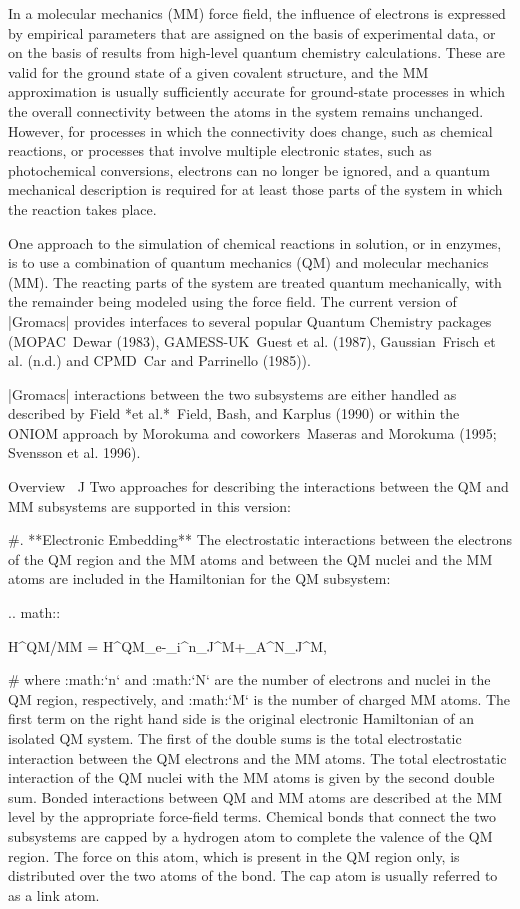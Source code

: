 In a molecular mechanics (MM) force field, the influence of electrons is
expressed by empirical parameters that are assigned on the basis of
experimental data, or on the basis of results from high-level quantum
chemistry calculations. These are valid for the ground state of a given
covalent structure, and the MM approximation is usually sufficiently
accurate for ground-state processes in which the overall connectivity
between the atoms in the system remains unchanged. However, for
processes in which the connectivity does change, such as chemical
reactions, or processes that involve multiple electronic states, such as
photochemical conversions, electrons can no longer be ignored, and a
quantum mechanical description is required for at least those parts of
the system in which the reaction takes place.

One approach to the simulation of chemical reactions in solution, or in
enzymes, is to use a combination of quantum mechanics (QM) and molecular
mechanics (MM). The reacting parts of the system are treated quantum
mechanically, with the remainder being modeled using the force field.
The current version of |Gromacs| provides interfaces to several popular
Quantum Chemistry packages (MOPAC Dewar (1983), GAMESS-UK Guest et al.
(1987), Gaussian Frisch et al. (n.d.) and CPMD Car and Parrinello
(1985)).

|Gromacs| interactions between the two subsystems are either handled as
described by Field *et al.* Field, Bash, and Karplus (1990) or within
the ONIOM approach by Morokuma and coworkers Maseras and Morokuma (1995;
Svensson et al. 1996).

Overview
^^^^^^^^

Two approaches for describing the interactions between the QM and MM
subsystems are supported in this version:

#. **Electronic Embedding** The electrostatic interactions between the
   electrons of the QM region and the MM atoms and between the QM nuclei
   and the MM atoms are included in the Hamiltonian for the QM
   subsystem:

   .. math::

      H^{QM/MM} =
      H^{QM}_e-\sum_i^n\sum_J^M+\sum_A^N\sum_J^M,

#  where :math:`n` and :math:`N` are the number of electrons and nuclei
   in the QM region, respectively, and :math:`M` is the number of
   charged MM atoms. The first term on the right hand side is the
   original electronic Hamiltonian of an isolated QM system. The first
   of the double sums is the total electrostatic interaction between the
   QM electrons and the MM atoms. The total electrostatic interaction of
   the QM nuclei with the MM atoms is given by the second double sum.
   Bonded interactions between QM and MM atoms are described at the MM
   level by the appropriate force-field terms. Chemical bonds that
   connect the two subsystems are capped by a hydrogen atom to complete
   the valence of the QM region. The force on this atom, which is
   present in the QM region only, is distributed over the two atoms of
   the bond. The cap atom is usually referred to as a link atom.


